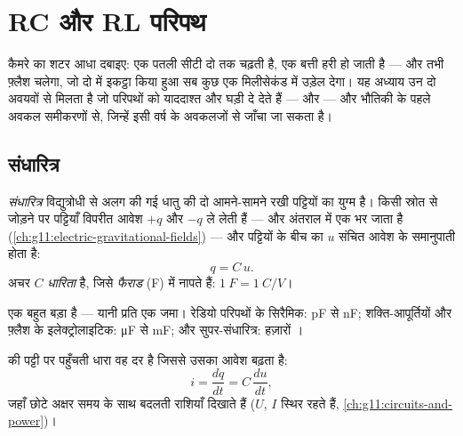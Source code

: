 \chapter{RC और RL परिपथ}\label{ch:g12:rc-rl-circuits}

कैमरे का शटर आधा दबाइए: एक पतली सीटी दो  तक चढ़ती है, एक बत्ती हरी
हो जाती है --- और तभी फ़्लैश चलेगा, जो दो  में इकट्ठा किया हुआ सब कुछ एक
मिलीसेकंड में उड़ेल देगा। यह अध्याय उन दो अवयवों से मिलता है जो परिपथों को
याददाश्त और घड़ी दे देते हैं ---  और  --- और
भौतिकी के पहले अवकल समीकरणों से, जिन्हें इसी वर्ष के अवकलजों से जाँचा जा सकता
है।

\section{संधारित्र}

\begin{definition}[संधारित्र और धारिता]\label{def:g12:rc-rl-circuits:capacitor}
\emph{संधारित्र}  विद्युत्रोधी से अलग की गई धातु
की दो आमने-सामने रखी पट्टियों का युग्म है। किसी स्रोत से जोड़ने पर पट्टियाँ
विपरीत आवेश $+q$ और $-q$ ले लेती हैं --- और अंतराल में एक  भर जाता है (\cref{ch:g11:electric-gravitational-fields}) --- और पट्टियों के बीच का  $u$
संचित आवेश के समानुपाती होता है:
\[ q = C\,u . \]
अचर $C$ \emph{धारिता} है, जिसे \emph{फैराड}
(\unit{F}) में नापते हैं: $\qty{1}{F} = \qty{1}{C/V}$।
\end{definition}

\begin{example}[परिमाण की कोटियाँ]\label{ex:g12:rc-rl-circuits:orders}
एक  बहुत बड़ा है --- यानी प्रति  एक 
जमा। रेडियो परिपथों के सिरैमिक: \unit{pF} से \unit{nF}; शक्ति-आपूर्तियों और
फ़्लैश के इलेक्ट्रोलाइटिक: \unit{\micro F} से \unit{mF}; और सुपर-संधारित्र: हज़ारों
।
\end{example}

\begin{proposition}[संधारित्र में जाती धारा]\label{prop:g12:rc-rl-circuits:cdudt}
 की पट्टी पर पहुँचती धारा वह दर है जिससे उसका आवेश बढ़ता है:
\[
i = \frac{dq}{dt} = C\,\frac{du}{dt} ,
\]
जहाँ छोटे अक्षर समय के साथ बदलती राशियाँ दिखाते हैं ($U$, $I$ स्थिर
रहते हैं, \cref{ch:g11:circuits-and-power})।
\end{proposition}

